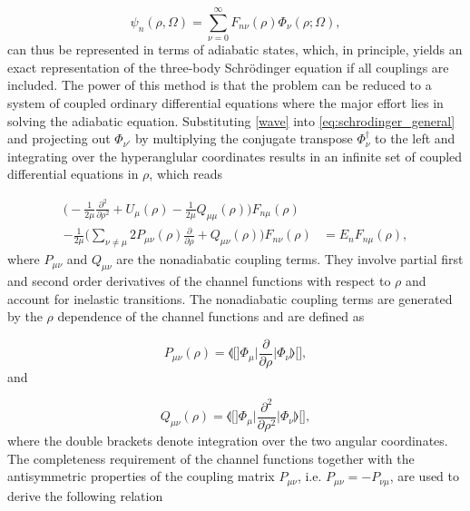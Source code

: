 \begin{equation}\label{wave}
\psi_{n}(\rho,\Omega) = \sum_{\nu=0}^{\infty} F_{n\nu}(\rho)\Phi_{\nu}(\rho;\Omega),
\end{equation}
can thus be represented in terms of adiabatic states, which, in principle, yields an exact representation of the three-body Schr{\"o}dinger equation if all couplings are included. The power of this method is that the problem can be reduced to a system of coupled ordinary differential equations where the major effort lies in solving the adiabatic equation. Substituting \eqref{wave} into \eqref{eq:schrodinger_general} and projecting out $\Phi_{\nu'}$ by multiplying the conjugate transpose $\Phi_{\nu}^{\dagger}$ to the left and integrating over the hyperanglular coordinates results in an infinite set of coupled differential equations in $\rho$, which reads

\begin{align}\label{fullhamiltonian}
\bigg(-\frac{1}{2 \mu}\frac{\partial^2}{ \partial \rho^2} + U_{\mu}(\rho) - \frac{1}{2\mu}Q_{\mu\mu}(\rho) \bigg)F_{n\mu}(\rho)&\nonumber\\ -\frac{1}{2\mu}\bigg(\sum_{\nu\neq\mu}2P_{\mu\nu}(\rho)\frac{\partial}{\partial\rho} + Q_{\mu\nu}(\rho) \bigg)F_{n\nu}(\rho)& = E_nF_{n\mu}(\rho),
\end{align}
where $P_{\mu\nu}$ and $Q_{\mu\nu}$ are the nonadiabatic coupling terms. They involve partial first and second order derivatives of the channel functions with respect to $\rho$ and account for inelastic transitions. The nonadiabatic coupling terms are generated by the $\rho$ dependence of the channel functions and are defined as 

\begin{equation}\label{couplingP}
P_{\mu\nu}(\rho) = \llangle[\Big]  \Phi_{\mu} \Big\lvert \frac{\partial}{\partial\rho} \Big\rvert  \Phi_{\nu} \rrangle[\Big],
\end{equation}
and

\begin{equation}\label{couplingQ}
Q_{\mu\nu}(\rho) = \llangle[\Big]  \Phi_{\mu} \Big\lvert \frac{\partial^2}{\partial\rho^2} \Big\rvert  \Phi_{\nu} \rrangle[\Big],
\end{equation}
where the double brackets denote integration over the two angular coordinates. The completeness requirement of the channel functions together with the antisymmetric properties of the coupling matrix $P_{\mu \nu}$,  i.e. $P_{\mu \nu}= - P_{\nu \mu}$, are used to derive the following relation 

